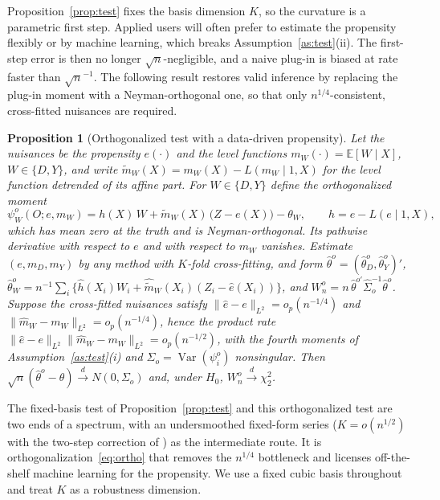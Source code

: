 \documentclass[preprint,11pt,authoryear]{elsarticle}
\newtheorem{proposition}{Proposition}
\theoremstyle{definition}
\newcommand{\E}{\mathbb{E}}
\newcommand{\Var}{\operatorname{Var}}
\newcommand{\convd}{\overset{d}{\longrightarrow}}
\begin{document}
Proposition~\ref{prop:test} fixes the basis dimension $K$, so the curvature is a
parametric first step. Applied users will often prefer to estimate the propensity
flexibly or by machine learning, which breaks Assumption~\ref{as:test}(ii). The
first-step error is then no longer $\sqrt n$-negligible, and a naive plug-in is
biased at rate faster than $\sqrt n^{-1}$. The following result restores valid
inference by replacing the plug-in moment with a Neyman-orthogonal one, so that
only $n^{1/4}$-consistent, cross-fitted nuisances are required.

\begin{proposition}[Orthogonalized test with a data-driven propensity]\label{prop:orthogonal}
Let the nuisances be the propensity $e(\cdot)$ and the level functions
$m_W(\cdot)=\E[W\mid X]$, $W\in\{D,Y\}$, and write
$\tilde m_W(X)=m_W(X)-L(m_W\mid 1,X)$ for the level function detrended of its
affine part. For $W\in\{D,Y\}$ define the orthogonalized moment
\begin{equation}\label{eq:ortho}
\psi^{o}_{W}(O;e,m_W)=h(X)\,W+\tilde m_W(X)\,\big(Z-e(X)\big)-\theta_W,
\qquad h=e-L(e\mid 1,X),
\end{equation}
which has mean zero at the truth and is Neyman-orthogonal. Its pathwise derivative
with respect to $e$ and with respect to $m_W$ vanishes. Estimate $(e,m_D,m_Y)$ by
any method with $K$-fold cross-fitting, and form
$\hat\theta^{o}=(\hat\theta^{o}_D,\hat\theta^{o}_Y)'$,
$\hat\theta^{o}_W=n^{-1}\sum_i\{\hat h(X_i)W_i+\hat{\tilde m}_W(X_i)(Z_i-\hat e(X_i))\}$,
and $W^{o}_n=n\,\hat\theta^{o\prime}\hat\Sigma_o^{-1}\hat\theta^{o}$. Suppose the
cross-fitted nuisances satisfy $\|\hat e-e\|_{L^2}=o_p(n^{-1/4})$ and
$\|\hat m_W-m_W\|_{L^2}=o_p(n^{-1/4})$, hence the product rate
$\|\hat e-e\|_{L^2}\|\hat m_W-m_W\|_{L^2}=o_p(n^{-1/2})$, with the fourth moments
of Assumption~\ref{as:test}(i) and $\Sigma_o=\Var(\psi^o_i)$ nonsingular. Then
$\sqrt n(\hat\theta^{o}-\theta)\convd N(0,\Sigma_o)$ and, under $H_0$,
$W^{o}_n\convd\chi^2_2$.
\end{proposition}

The fixed-basis test of Proposition~\ref{prop:test} and this orthogonalized test are
two ends of a spectrum, with an undersmoothed fixed-form series ($K=o(n^{1/2})$ with the
two-step correction of \citet{newey1994}) as the intermediate route. It is
orthogonalization~\eqref{eq:ortho} that removes the $n^{1/4}$ bottleneck and licenses
off-the-shelf machine learning for the propensity. We use a fixed cubic basis throughout
and treat $K$ as a robustness dimension.
\end{document}
